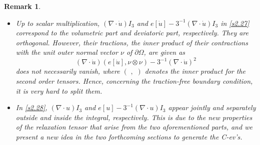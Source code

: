 \documentclass[a4paper,12pt]{article}
\newtheorem{remark}[Th]{Remark}
\newtheorem{a priori condition}[Th]{A priori condition}
\begin{document}
\begin{remark}
\begin{itemize}

\noindent
\item[\rm{(i)}]
Up to scalar multiplication,  $(\nabla\cdot\dot u)I_3$ and $e[\dot u]-3^{-1}(\nabla\cdot\dot u)I_3$ in \eqref{s2.27} correspond to the volumetric part and deviatoric part, respectively. They are orthogonal. However, their tractions, the inner product of their contractions with the unit outer normal vector $\nu$ of $\partial\Omega$, are given as
$$
(\nabla\cdot\dot u)(e[\dot u],\nu\otimes\nu)-3^{-1}(\nabla\cdot\dot u)^2
$$
does not necessarily vanish, where $(\,\,,\,\,)$ denotes the inner product for the second order tensors. Hence, concerning the traction-free boundary condition, it is very hard to split them.
\item[\rm{(ii)}] In \eqref{s2.28}, $(\nabla\cdot u)I_3$ and $e[u]-3^{-1}(\nabla\cdot u)I_3$ appear jointly and separately outside and inside the integral, respectively. This is due to the new properties of the relaxation tensor that arise from the two aforementioned parts, and we present a new idea in the two forthcoming sections to generate the C-ev's.

\end{itemize}
\end{remark}

 
\end{document}
